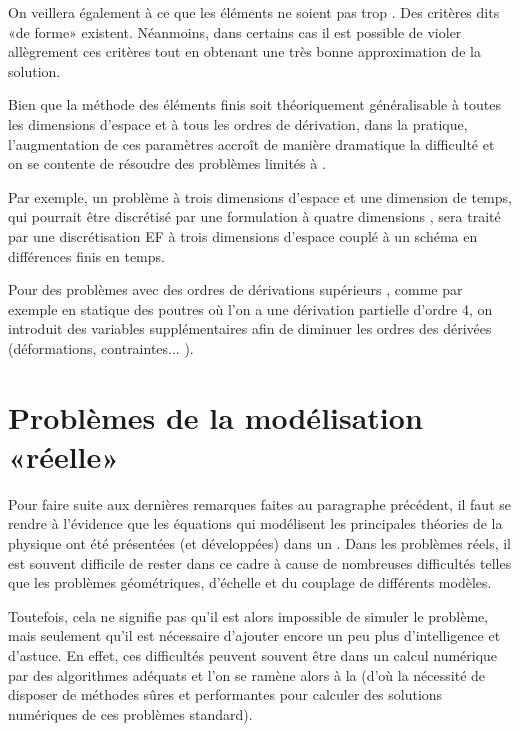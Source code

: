 On veillera également à ce que les éléments ne soient pas trop
. Des critères dits «de forme» existent. Néanmoins, dans
certains cas il est possible de violer allègrement ces critères tout en
obtenant une très bonne approximation de la solution.


\medskip
Bien que la méthode des éléments finis soit théoriquement généralisable à toutes les dimensions d'espace et à
tous les ordres de dérivation, dans la pratique, l'augmentation de ces paramètres accroît de
manière dramatique la difficulté et on se contente de résoudre des problèmes limités à
.

Par exemple, un problème à trois dimensions d'espace et une dimension de temps,
qui pourrait être discrétisé par une formulation à quatre dimensions
, sera traité par
une discrétisation EF à trois dimensions d'espace couplé à un schéma en
différences finis en temps.

Pour des problèmes avec des ordres de dérivations supérieurs , comme par exemple en statique des poutres
où l'on a une dérivation partielle d'ordre 4, on introduit des variables supplémentaires
afin de diminuer les ordres des dérivées (déformations, contraintes... ).


\medskip
\section{Problèmes de la modélisation «réelle»}

Pour faire suite aux dernières remarques faites au paragraphe précédent, il faut
se rendre à l'évidence que les équations qui modélisent les principales théories
de la physique ont été présentées (et développées) dans un .
Dans les problèmes réels, il est souvent difficile de rester dans ce cadre à cause de
nombreuses difficultés telles que les problèmes géométriques, d'échelle et du couplage
de différents modèles.

Toutefois, cela ne signifie pas qu'il est alors impossible de simuler le problème, mais seulement
qu'il est nécessaire d'ajouter encore un peu plus d'intelligence et d'astuce.
En effet, ces difficultés peuvent souvent être  dans un
calcul numérique par des algorithmes adéquats et l'on se ramène alors à la
(d'où la nécessité de disposer de méthodes sûres et performantes pour calculer
des solutions numériques de ces problèmes standard).


